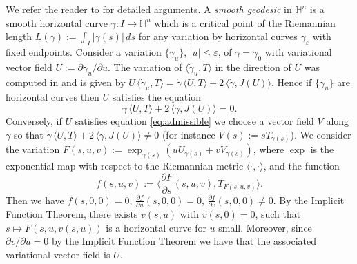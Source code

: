 \documentclass[10pt]{amsart}
\theoremstyle{definition}
\theoremstyle{remark}
\numberwithin{equation}{section}
\begin{document}
We refer the reader to \cite[\S~3]{MR2435652} for detailed arguments.  A \emph{smooth geodesic} in ${{\mathbb{H}}}^n$ is a smooth horizontal curve ${\gamma}:I\to{{\mathbb{H}}}^n$ which is a critical point of the Riemannian length $L({\gamma}):=\int_{I}|\dot{\gamma}(s)|\,ds$ for any variation by horizontal curves ${\gamma}_{\varepsilon}$ with fixed endpoints. Consider a variation $\{{\gamma}_u\}$, $|u|{\leqslant} {\varepsilon}$, of ${\gamma}={\gamma}_0$ with variational vector field $U:={\partial}{\gamma}_u/{\partial} u$. The variation of ${\langle{\dot{\gamma}_u,T}\rangle}$ in the direction of $U$ was computed in \cite{MR2271950} and is given by $U\,{\langle{\dot{\gamma}_u,T}\rangle}=\dot{\gamma}\,{\langle{U,T}\rangle}+2\,{\langle{\dot{\gamma},J(U)}\rangle}$. Hence if $\{{\gamma}_u\}$ are horizontal curves then $U$ satisfies the equation
\begin{equation}
\label{eq:admissible}
\dot{\gamma}\,{\langle{U,T}\rangle}+2\,{\langle{\dot{\gamma},J(U)}\rangle}=0.
\end{equation}
Conversely, if $U$ satisfies equation \eqref{eq:admissible} we choose a vector field $V$ along ${\gamma}$ so that $\dot{\gamma}\,{\langle{U,T}\rangle}+2\,{\langle{\dot{\gamma},J(U)}\rangle}\neq 0$ (for instance $V(s):=sT_{{\gamma}(s)}$). We consider the variation $F(s,u,v):=\exp_{{\gamma}(s)}(uU_{{\gamma}(s)}+vV_{{\gamma}(s)})$, where $\exp$ is the exponential map with respect to the Riemannian metric ${\langle{\cdot,\cdot}\rangle}$, and the function
\[
f(s,u,v):={\langle{\frac{{\partial} F}{{\partial} s}(s,u,v),T_{F(s,u,v)}}\rangle}.
\]
Then we have $f(s,0,0)=0$, $\tfrac{{\partial} f}{{\partial} u}(s,0,0)=0$, $\tfrac{{\partial} f}{{\partial} v}(s,0,0)\neq 0$. By the Implicit Function Theorem, there exists $v(s,u)$ with $v(s,0)=0$, such that $s\mapsto F(s,u,v(s,u))$ is a horizontal curve for $u$ small. Moreover, since ${\partial} v/{\partial} u=0$ by the Implicit Function Theorem we have that the associated variational vector field is $U$.
\end{document}

